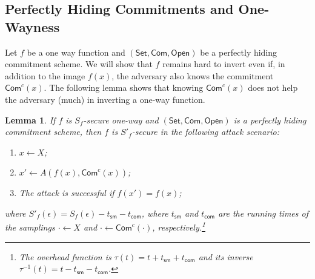 \documentclass{article}
\newtheorem{lemma}{Lemma}[section]
\newcommand{\setup}[0]{\mathsf{Set}}
\newcommand{\commit}[0]{\mathsf{Com}}
\newcommand{\open}[0]{\mathsf{Open}}
\newcommand{\commitc}[0]{{\mathsf{Com}^{c}}}
\begin{document}
\subsection{Perfectly Hiding Commitments and One-Wayness}

Let $f$ be a one way function and $(\setup, \commit, \open)$ be a perfectly hiding commitment scheme. We will show that $f$ remains hard to invert even if, in addition to the image $f(x)$, the adversary also knows the commitment $\commitc(x)$. The following lemma shows that knowing $\commitc(x)$ does not help the adversary (much) in inverting a one-way function.

\begin{lemma}
If $f$ is $S_f$-secure one-way and $(\setup, \commit, \open)$ is a perfectly hiding commitment scheme, then $f$ is $S'_f$-secure in the following attack scenario:
\begin{enumerate}
\item $x\gets X$;
\item $x'\gets A(f(x),\commitc(x))$;
\item The attack is successful if $f(x')=f(x)$;
\end{enumerate}
where $S'_f(\epsilon) = S_f(\epsilon) - t_\mathsf{sm} - t_\mathsf{com}$, where $t_\mathsf{sm}$ and $t_\mathsf{com}$ are the running times of the samplings $\cdot\gets X$ and $\cdot\gets \commitc(\cdot)$, respectively.\footnote{The overhead function is $\tau(t)=t + t_\mathsf{sm} + t_\mathsf{com}$ and its inverse $\tau^{-1}(t) = t - t_\mathsf{sm} - t_\mathsf{com}$.}
\end{lemma}
\end{document}
